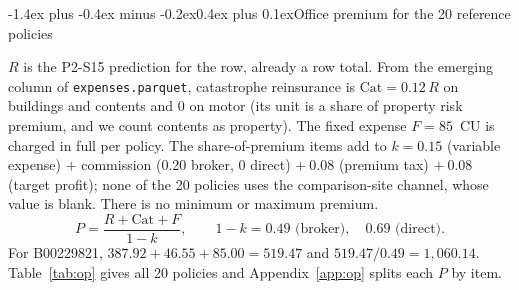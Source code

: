 \documentclass[11pt,a4paper]{article}
\makeatletter
\renewcommand\subsection{\@startsection{subsection}{2}{\z@}%
  {-1.4ex plus -0.4ex minus -0.2ex}{0.4ex plus 0.1ex}{\normalfont\normalsize\bfseries}}
\newcommand{\code}[1]{\texttt{#1}}
\makeatother
\begin{document}
\subsection{Office premium for the 20 reference policies}

$R$ is the P2-S15 prediction for the row, already a row total. From the emerging column of \code{expenses.parquet},
catastrophe reinsurance is $\text{Cat} = 0.12\,R$ on buildings and contents and 0 on motor (its unit is a share of
property risk premium, and we count contents as property). The fixed expense $F = 85$~CU is charged in full per policy.
The share-of-premium items add to $k = 0.15$ (variable expense) $+$ commission (0.20 broker, 0 direct) $+\ 0.08$
(premium tax) $+\ 0.08$ (target profit); none of the 20 policies uses the comparison-site channel, whose value is blank.
There is no minimum or maximum premium.
\[
P = \frac{R + \text{Cat} + F}{1-k},\qquad 1-k = 0.49 \text{ (broker)},\quad 0.69 \text{ (direct)}.
\]
For B00229821, $387.92 + 46.55 + 85.00 = 519.47$ and $519.47/0.49 = 1{,}060.14$. Table~\ref{tab:op} gives all 20
policies and Appendix~\ref{app:op} splits each $P$ by item.
\end{document}
